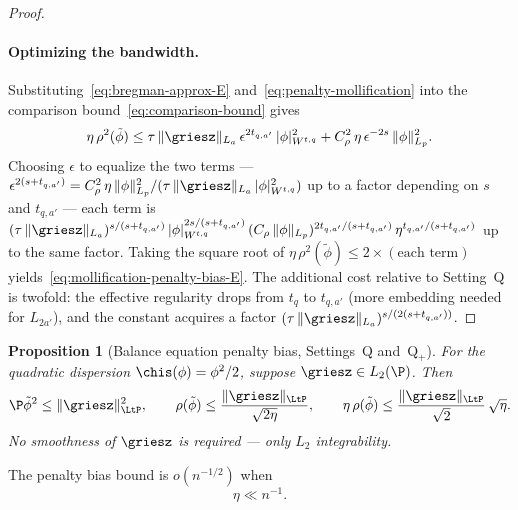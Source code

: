 \documentclass{article}
\newtheorem{proposition}[theorem]{Proposition}
\begin{document}
\begin{proof}
\paragraph{Optimizing the bandwidth.}
Substituting~\eqref{eq:bregman-approx-E}
and~\eqref{eq:penalty-mollification}
into the comparison bound~\eqref{eq:comparison-bound}
gives
\[
\eta\,\rho^2(\tilde\phi)
  \le \tau\,\|\griesz\|_{L_a}\,
  \epsilon^{2t_{q,a'}}\,|\phi|_{W^{t,q}}^2
  + C_\rho^2\,\eta\,\epsilon^{-2s}\,
    \|\phi\|_{L_p}^2.
\]
Choosing $\epsilon$
to equalize the two terms ---
$\epsilon^{2(s+t_{q,a'})}
  = C_\rho^2\,\eta\,\|\phi\|_{L_p}^2
  / (\tau\,\|\griesz\|_{L_a}\,
  |\phi|_{W^{t,q}}^2)$
up to a factor depending on $s$ and $t_{q,a'}$ ---
each term is
$(\tau\,\|\griesz\|_{L_a})^{s/(s+t_{q,a'})}\,
  |\phi|_{W^{t,q}}^{2s/(s+t_{q,a'})}\,
  (C_\rho\,\|\phi\|_{L_p})^{2t_{q,a'}/(s+t_{q,a'})}\,
  \eta^{t_{q,a'}/(s+t_{q,a'})}$
up to the same factor.
Taking the square root
of $\eta\,\rho^2(\tilde\phi)
  \le 2 \times (\text{each term})$
yields~\eqref{eq:mollification-penalty-bias-E}.
The additional cost relative to Setting~Q
is twofold:
the effective regularity drops
from $t_q$ to $t_{q,a'}$
(more embedding needed for $L_{2a'}$),
and the constant acquires a factor
$(\tau\,\|\griesz\|_{L_a})^{s/(2(s+t_{q,a'}))}$.
\end{proof}

\begin{proposition}[Balance equation penalty bias, Settings~Q and~Q$_+$]
\label{prop:penalty-bias-balance}
For the quadratic dispersion
$\chis(\phi) = \phi^2/2$,
suppose $\griesz \in L_2(\P)$.
Then
\begin{equation}
\label{eq:balance-penalty-bias}
\P\tilde\phi^2 \le \|\griesz\|_{\LtP}^2,
\qquad
\rho(\tilde\phi) \le \frac{\|\griesz\|_{\LtP}}{\sqrt{2\eta}},
\qquad
\eta\,\rho(\tilde\phi)
  \le \frac{\|\griesz\|_{\LtP}}{\sqrt{2}}\,
  \sqrt{\eta}.
\end{equation}
No smoothness of $\griesz$ is required
--- only $L_2$ integrability.
\end{proposition}

The penalty bias bound
is $o(n^{-1/2})$ when
\begin{equation}
\label{eq:lambda-upper-edge}
\eta \ll n^{-1}.
\end{equation}
\end{document}
